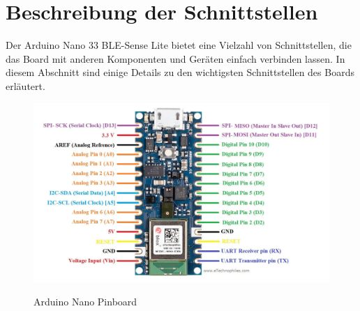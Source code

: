 \section{Beschreibung der Schnittstellen}
Der Arduino Nano 33 BLE-Sense Lite bietet eine Vielzahl von Schnittstellen, die das Board mit anderen Komponenten und Geräten einfach verbinden lassen. In diesem Abschnitt sind einige Details zu den wichtigsten Schnittstellen des Boards erläutert.
\begin{figure}[htb]
	\includegraphics[width=14cm]{General/ArduinoPinBoard.png}
	\caption{Arduino Nano Pinboard} \label{Arduino Nano Pinbout}\begin{center}
		\cite{Arduino2023} %
	\end{center}
\end{figure}
